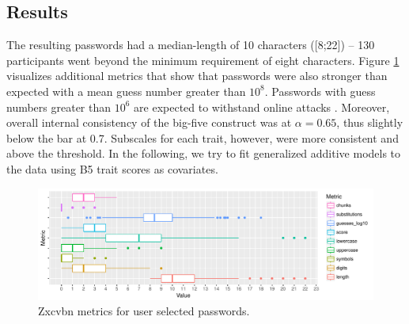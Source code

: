 \subsection{Results}
The resulting passwords had a median-length of 10 characters ([8;22]) -- 130 participants went beyond the minimum requirement of eight characters. Figure \ref{fig:personality:study3:metrics-overview} visualizes additional metrics that show that passwords were also stronger than expected with a mean guess number greater than $10^8$. Passwords with guess numbers greater than $10^6$ are expected to withstand online attacks \cite{Florencio2014AdministratorsGuide}. Moreover, overall internal consistency of the big-five construct was at $\alpha=0.65$, thus slightly below the bar at 0.7. Subscales for each trait, however, were more consistent and above the threshold. In the following, we try to fit generalized additive models to the data using B5 trait scores as covariates. 

\begin{figure}[tbph]
	\centering
	\includegraphics[width=1\linewidth]{figures/personality/study3-metrics-overview}
	\caption{\label{fig:personality:study3:metrics-overview} Zxcvbn metrics for user selected passwords.}
\end{figure}

